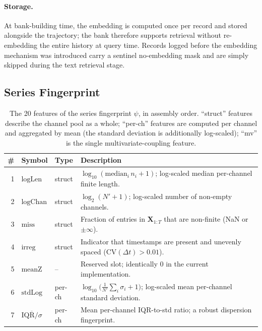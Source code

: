 \paragraph{Storage.}
At bank-building time, the embedding is computed once per record and
stored alongside the trajectory; the bank therefore supports retrieval
without re-embedding the entire history at query time. Records logged
before the embedding mechanism was introduced carry a sentinel
no-embedding mask and are simply skipped during the text retrieval
stage.

\subsection{Series Fingerprint}
\label{app:fingerprint}


\begin{table}[t]
\centering
\small
\caption{The 20 features of the series fingerprint $\psi$, in
assembly order. ``struct'' features describe the channel pool as a
whole; ``per-ch'' features are computed per channel and aggregated by
mean (the standard deviation is additionally log-scaled);
``mv'' is the single multivariate-coupling feature.}
\label{tab:fingerprint_features}
\begin{tabular}{rllp{}}
\toprule
\# & Symbol & Type & Description \\
\midrule
1  & $\mathrm{logLen}$              & struct & $\log_{10}(\mathrm{median}_i\, n_i + 1)$; log-scaled median per-channel finite length. \\
2  & $\mathrm{logChan}$             & struct & $\log_2(N' + 1)$; log-scaled number of non-empty channels. \\
3  & $\mathrm{miss}$                & struct & Fraction of entries in $\mathbf{X}_{1:T}$ that are non-finite (NaN or $\pm\infty$). \\
4  & $\mathrm{irreg}$               & struct & Indicator that timestamps are present and unevenly spaced ($\mathrm{CV}(\Delta t) > 0.01$). \\
5  & $\mathrm{meanZ}$               & --     & Reserved slot; identically $0$ in the current implementation. \\
6  & $\mathrm{stdLog}$              & per-ch & $\log_{10}\!\big(\tfrac{1}{N'}\sum_i \sigma_i + 1\big)$; log-scaled mean per-channel standard deviation. \\
7  & $\overline{\mathrm{IQR}/\sigma}$ & per-ch & Mean per-channel IQR-to-std ratio; a robust dispersion fingerprint. \\

\end{tabular}
\end{table}
